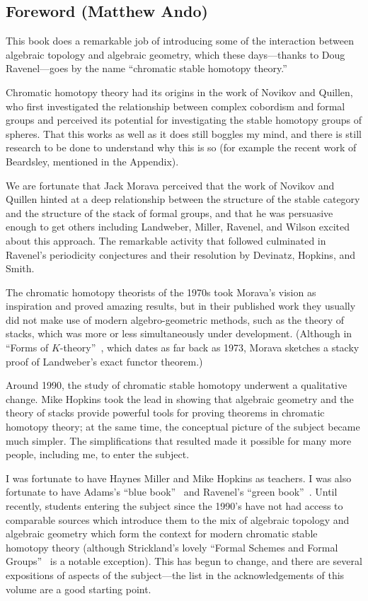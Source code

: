 
\subsection*{Foreword (Matthew Ando)}

This book does a remarkable job of introducing some of the 
interaction between algebraic topology and algebraic geometry, which
these days---thanks to Doug Ravenel---goes by the name ``chromatic
stable homotopy theory.''

Chromatic homotopy theory had its origins in the work of Novikov and
Quillen, who first investigated the relationship between complex
cobordism and formal groups and perceived its potential for
investigating the stable homotopy groups of spheres. That this works
as well as it does still boggles my mind, and there is still research
to be done to understand why this is so (for example the recent work
of Beardsley, mentioned in the Appendix).  

We are fortunate that Jack Morava perceived that the work of Novikov
and Quillen hinted at a deep relationship between the structure of
the stable category and the structure of the stack of formal groups,
and that he was persuasive enough to get others including Landweber,
Miller, Ravenel, and Wilson excited about this approach. The
remarkable activity that followed culminated in  Ravenel's periodicity
conjectures and their resolution by Devinatz, Hopkins, and Smith. 

The chromatic homotopy theorists of the 1970s took Morava's
vision as inspiration and proved amazing results, but in their
published work they usually did not make use of modern
algebro-geometric methods, such as the theory of stacks, which was
more or less simultaneously under development.  (Although in
``Forms of $K$-theory''~\cite{MoravaFormsOfKthy}, which dates as far back as 1973, Morava sketches
a stacky proof of Landweber's exact functor theorem.)

Around 1990, the study of chromatic stable homotopy underwent a
qualitative change. Mike Hopkins took the lead in
showing that algebraic geometry and the theory of stacks
provide powerful tools for proving theorems in chromatic homotopy
theory; at the same time, the conceptual picture of the subject became
much simpler.  The simplifications that resulted made it possible for
many more people, including me, to enter the subject. 

I was fortunate to have Haynes Miller and Mike Hopkins as
teachers.  I was also fortunate to have Adams's ``blue book''~\cite{AdamsBlueBook} and
Ravenel's ``green book''~\cite{RavenelGreenBook}. Until recently, students entering the
subject since the 1990's have not had access to comparable sources
which introduce them to the mix of algebraic topology and algebraic
geometry which form the context for  
modern chromatic stable homotopy theory (although Strickland's 
lovely 
``Formal Schemes and Formal Groups''~\cite{StricklandFSFG} is a notable exception).  This has
begun to change, and there are several expositions of aspects of the
subject---the list in the acknowledgements of this volume are a good
starting point.  

